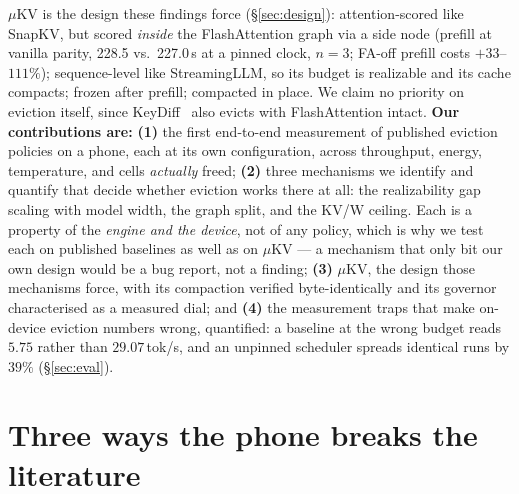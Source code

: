 \documentclass[sigconf,10pt]{acmart}
\begin{document}
$\mu$KV is the design these findings force (\S\ref{sec:design}): attention-scored like SnapKV, but scored \emph{inside} the FlashAttention graph via a side node (prefill at vanilla parity, 228.5 vs.\ 227.0\,s at a pinned clock, $n{=}3$; FA-off prefill costs $+33$--$111\%$); sequence-level like StreamingLLM, so its budget is realizable and its cache compacts; frozen after prefill; compacted in place. We claim no priority on eviction itself, since KeyDiff~\cite{keydiff} also evicts with FlashAttention intact. \textbf{Our contributions are:} \textbf{(1)} the first end-to-end measurement of published eviction policies on a phone, each at its own configuration, across throughput, energy, temperature, and cells \emph{actually} freed; \textbf{(2)} three mechanisms we identify and quantify that decide whether eviction works there at all: the realizability gap scaling with model width, the graph split, and the KV/W ceiling. Each is a property of the \emph{engine and the device}, not of any policy, which is why we test each on published baselines as well as on $\mu$KV --- a mechanism that only bit our own design would be a bug report, not a finding; \textbf{(3)} $\mu$KV, the design those mechanisms force, with its compaction verified byte-identically and its governor characterised as a measured dial; and \textbf{(4)} the measurement traps that make on-device eviction numbers wrong, quantified: a baseline at the wrong budget reads $5.75$ rather than $29.07$\,tok/s, and an unpinned scheduler spreads identical runs by $39\%$ (\S\ref{sec:eval}).

\section{Three ways the phone breaks the literature}
\label{sec:break}
\end{document}
